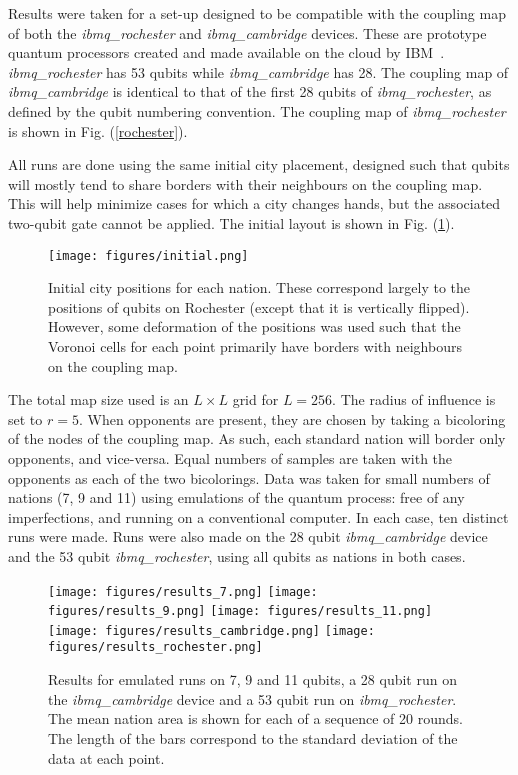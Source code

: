 \documentclass[conference]{IEEEtran}
\begin{document}
Results were taken for a set-up designed to be compatible with the coupling map of both the \textit{ibmq\_rochester} and \textit{ibmq\_cambridge} devices. These are prototype quantum processors created and made available on the cloud by IBM~\cite{ibm-nisq}. \textit{ibmq\_rochester} has 53 qubits while \textit{ibmq\_cambridge} has 28. The coupling map of \textit{ibmq\_cambridge} is identical to that of the first 28 qubits of \textit{ibmq\_rochester}, as defined by the qubit numbering convention. The coupling map of \textit{ibmq\_rochester} is shown in Fig. (\ref{rochester}).

All runs are done using the same initial city placement, designed such that qubits will mostly tend to share borders with their neighbours on the coupling map. This will help minimize cases for which a city changes hands, but the associated two-qubit gate cannot be applied. The initial layout is shown in Fig. (\ref{initial}).

\begin{figure}[htbp]
\begin{center}
\texttt{[image: figures/initial.png]}
\caption{Initial city positions for each nation. These correspond largely to the positions of qubits on Rochester (except that it is vertically flipped). However, some deformation of the positions was used such that the Voronoi cells for each point primarily have borders with neighbours on the coupling map.}
\label{initial}
\end{center}
\end{figure}


The total map size used is an $L \times L$ grid for $L=256$. The radius of influence is set to $r=5$. When opponents are present, they are chosen by taking a bicoloring of the nodes of the coupling map. As such, each standard nation will border only opponents, and vice-versa. Equal numbers of samples are taken with the opponents as each of the two bicolorings. Data was taken for small numbers of nations (7, 9 and 11) using emulations of the quantum process: free of any imperfections, and running on a conventional computer. In each case, ten distinct runs were made. Runs were also made on the 28 qubit \textit{ibmq\_cambridge} device and the 53 qubit \textit{ibmq\_rochester}, using all qubits as nations in both cases.

\begin{figure}[htbp]
\begin{center}
\texttt{[image: figures/results\_7.png]}
\texttt{[image: figures/results\_9.png]}
\texttt{[image: figures/results\_11.png]}
\texttt{[image: figures/results\_cambridge.png]}
\texttt{[image: figures/results\_rochester.png]}
\caption{Results for emulated runs on 7, 9 and 11 qubits, a 28 qubit run on the \textit{ibmq\_cambridge} device and a 53 qubit run on \textit{ibmq\_rochester}. The mean nation area is shown for each of a sequence of 20 rounds. The length of the bars correspond to the standard deviation of the data at each point.}
\label{default}
\end{center}
\end{figure}
\end{document}
